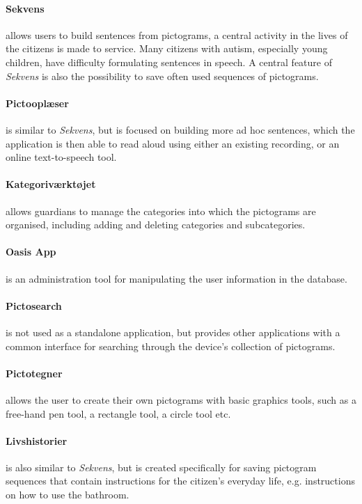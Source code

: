 \paragraph{Sekvens}
allows users to build sentences from pictograms, a central activity in the lives of the citizens \giraf is made to service. Many citizens with autism, especially young children, have difficulty formulating sentences in speech. A central feature of \textit{Sekvens} is also the possibility to save often used sequences of pictograms.

\paragraph{Pictooplæser}
is similar to \textit{Sekvens}, but is focused on building more ad hoc sentences, which the application is then able to read aloud using either an existing recording, or an online text-to-speech tool. 

\paragraph{Kategoriværktøjet}
allows guardians to manage the categories into which the pictograms are organised, including adding and deleting categories and subcategories.

\paragraph{Oasis App}
is an administration tool for manipulating the user information in the database. 

\paragraph{Pictosearch}
is not used as a standalone application, but provides other applications with a common interface for searching through the device's collection of pictograms.

\paragraph{Pictotegner}
allows the user to create their own pictograms with basic graphics tools, such as a free-hand pen tool, a rectangle tool, a circle tool etc. 

\paragraph{Livshistorier}
is also similar to \textit{Sekvens}, but is created specifically for saving pictogram sequences that contain instructions for the citizen's everyday life, e.g. instructions on how to use the bathroom.

